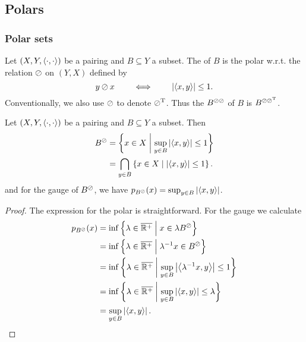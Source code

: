 \subsection{Polars}
\subsubsection{Polar sets}
\begin{definition}
Let $\left( X,Y,\left\langle \cdot,\cdot \right\rangle \right)$ be a pairing and $B\subseteq Y$ a subset. The  of $B$ is the polar w.r.t. the relation $\oslash$ on $(Y,X)$ defined by
\[ y\oslash x \qquad\iff\qquad \left|\left\langle x, y \right\rangle\right| \leq 1. \]
Conventionally, we also use $\oslash$ to denote $\oslash^{\mathrm{T}}$. Thus the  $B^{\oslash\oslash}$ of $B$ is $B^{\oslash\oslash^{\mathrm{T}}}$.
\end{definition}

\begin{lemma} \label{polarLemma}
Let $\left( X,Y,\left\langle \cdot,\cdot \right\rangle \right)$ be a pairing and $B\subseteq Y$ a subset. Then
\begin{align*}
B^{\oslash} &= \left\{ x\in X \;\middle|\; \sup_{y\in B}\left|\left\langle x,y \right\rangle\right| \leq 1 \right\} \\
&= \bigcap_{y\in B}\left\{ x\in X \;\middle|\; \left|\left\langle x,y \right\rangle\right|\leq 1 \right\}.
\end{align*}
and for the gauge of $B^\oslash$, we have $p_{B^\oslash}(x) = \sup_{y\in B}\left|\left\langle x,y \right\rangle\right|$.
\end{lemma}
\begin{proof}
The expression for the polar is straightforward. For the gauge we calculate
\begin{align*}
p_{B^\oslash}(x) &= \inf \left\{ \lambda\in\overline{\mathbb{R}^+} \;\middle|\; x\in \lambda B^\oslash \right\} \\
&= \inf \left\{ \lambda\in\overline{\mathbb{R}^+} \;\middle|\; \lambda^{-1}x\in B^\oslash \right\} \\
&= \inf \left\{ \lambda\in\overline{\mathbb{R}^+} \;\middle|\; \sup_{y\in B}\left|\left\langle \lambda^{-1}x,y \right\rangle\right|\leq 1 \right\} \\
&= \inf \left\{ \lambda\in\overline{\mathbb{R}^+} \;\middle|\; \sup_{y\in B}\left|\left\langle x,y \right\rangle\right|\leq \lambda \right\} \\
&= \sup_{y\in B}\left|\left\langle x,y \right\rangle\right|.
\end{align*}
\end{proof}

